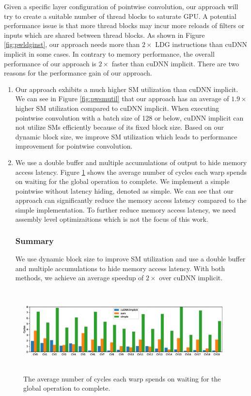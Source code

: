Given a specific layer configuration of pointwise convolution, our approach will try to create a suitable number of thread blocks to saturate GPU. 
A potential performance issue is that more thread blocks may incur more reloads of filters or inputs which are shared between thread blocks. 
As shown in Figure \ref{fig:pwldginst}, our approach needs more than $2\times$ LDG instructions than cuDNN implicit in some cases.
In contrary to memory performance, the overall performance of our approach is $2\times$ faster than cuDNN implicit.
There are two reasons for the performance gain of our approach. 
\begin{enumerate}
	\item Our approach exhibits a much higher SM utilization than cuDNN implicit.
	We can see in Figure \ref{fig:pwsmutil} that our approach has an average of $1.9\times$ higher SM utilization compared to cuDNN implicit.
	When executing pointwise convolution with a batch size of 128 or below, cuDNN implicit can not utilize SMs efficiently because of its fixed block size. 
	Based on our dynamic block size, we improve SM utilization which leads to performance improvement for pointwise convolution.
	\item We use a double buffer and multiple accumulations of output to hide memory access latency.
	Figure \ref{fig:stalllongscore} shows the average number of cycles each warp spends on waiting for the global operation to complete. 
	We implement a simple pointwise without latency hiding, denoted as simple. 
	We can see that our approach can significantly reduce the memory access latency compared to the simple implementation.
	To further reduce memory access latency, we need assembly level optimizaitions which is not the focus of this work.
\subsubsection{Summary} We use dynamic block size to improve SM utilization and use a double buffer and multiple accumulations to hide memory access latency. With both methods, we achieve an average speedup of $2\times$ over cuDNN implicit.
\end{enumerate}

\begin{figure}
    \centering
    \includegraphics[width=0.97\textwidth,height=4.5cm]{./figure/longscore.eps}
    \caption{The average number of cycles each warp spends on waiting for the global operation to complete.}
    \label{fig:stalllongscore}
\end{figure}

